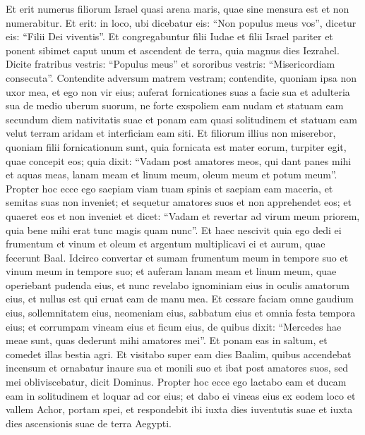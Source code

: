 \begin{biblechapter}
\begin{biblechapter}
 \verse Et erit numerus filiorum Israel
 quasi arena maris,
 quae sine mensura est et non numerabitur.
 Et erit: in loco, ubi dicebatur eis:
 “Non populus meus vos”,
 dicetur eis: “Filii Dei viventis”.
 \verse Et congregabuntur filii Iudae
 et filii Israel pariter
 et ponent sibimet caput unum
 et ascendent de terra,
 quia magnus dies Iezrahel.
 \verse Dicite fratribus vestris: “Populus meus”
 et sororibus vestris: “Misericordiam consecuta”.
 \verse Contendite adversum matrem vestram; contendite,
 quoniam ipsa non uxor mea,
 et ego non vir eius;
 auferat fornicationes suas a facie sua
 et adulteria sua de medio uberum suorum,
 \verse ne forte exspoliem eam nudam
 et statuam eam secundum diem nativitatis suae
 et ponam eam quasi solitudinem
 et statuam eam velut terram aridam
 et interficiam eam siti.
 \verse Et filiorum illius non miserebor,
 quoniam filii fornicationum sunt,
 \verse quia fornicata est mater eorum,
 turpiter egit, quae concepit eos;
 quia dixit: “Vadam post amatores meos,
 qui dant panes mihi et aquas meas,
 lanam meam et linum meum,
 oleum meum et potum meum”.
 \verse Propter hoc ecce ego saepiam
 viam tuam spinis
 et saepiam eam maceria,
 et semitas suas non inveniet;
 \verse et sequetur amatores suos
 et non apprehendet eos;
 et quaeret eos et non inveniet
 et dicet: “Vadam et revertar
 ad virum meum priorem,
 quia bene mihi erat tunc magis quam nunc”.
 \verse Et haec nescivit quia ego
 dedi ei frumentum et vinum et oleum
 et argentum multiplicavi ei
 et aurum, quae fecerunt Baal.
 \verse Idcirco convertar et sumam
 frumentum meum in tempore suo
 et vinum meum in tempore suo;
 et auferam lanam meam et linum meum,
 quae operiebant pudenda eius,
 \verse et nunc revelabo ignominiam eius
 in oculis amatorum eius,
 et nullus est qui eruat eam de manu mea.
 \verse Et cessare faciam omne gaudium eius,
 sollemnitatem eius, neomeniam eius,
 sabbatum eius et omnia festa tempora eius;
 \verse et corrumpam vineam eius et ficum eius,
 de quibus dixit: “Mercedes hae meae sunt,
 quas dederunt mihi amatores mei”.
 Et ponam eas in saltum,
 et comedet illas bestia agri.
 \verse Et visitabo super eam dies Baalim,
 quibus accendebat incensum
 et ornabatur inaure sua et monili suo
 et ibat post amatores suos,
 sed mei obliviscebatur,
 dicit Dominus.
 \verse Propter hoc ecce ego lactabo eam
 et ducam eam in solitudinem
 et loquar ad cor eius;
 \verse et dabo ei vineas eius ex eodem loco
 et vallem Achor, portam spei,
 et respondebit ibi
 iuxta dies iuventutis suae
 et iuxta dies ascensionis suae de terra Aegypti.

\end{biblechapter}
\end{biblechapter}
